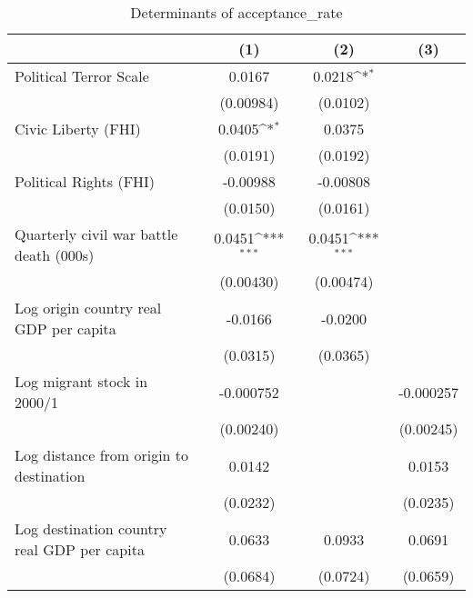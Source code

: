 \begin{table}[htbp]\centering
\def\sym#1{\ifmmode^{#1}\else\(^{#1}\)\fi}
\caption{Determinants of acceptance\_rate}
\begin{tabular}{l*{3}{c}}
\hline\hline
                    &\multicolumn{1}{c}{(1)}         &\multicolumn{1}{c}{(2)}         &\multicolumn{1}{c}{(3)}         \\
\hline
Political Terror Scale&      0.0167         &      0.0218\sym{*}  &                     \\
                    &   (0.00984)         &    (0.0102)         &                     \\
[1em]
Civic Liberty (FHI) &      0.0405\sym{*}  &      0.0375         &                     \\
                    &    (0.0191)         &    (0.0192)         &                     \\
[1em]
Political Rights (FHI)&    -0.00988         &    -0.00808         &                     \\
                    &    (0.0150)         &    (0.0161)         &                     \\
[1em]
Quarterly civil war battle death (000s)&      0.0451\sym{***}&      0.0451\sym{***}&                     \\
                    &   (0.00430)         &   (0.00474)         &                     \\
[1em]
Log origin country real GDP per capita&     -0.0166         &     -0.0200         &                     \\
                    &    (0.0315)         &    (0.0365)         &                     \\
[1em]
Log migrant stock in 2000/1&   -0.000752         &                     &   -0.000257         \\
                    &   (0.00240)         &                     &   (0.00245)         \\
[1em]
Log distance from origin to destination&      0.0142         &                     &      0.0153         \\
                    &    (0.0232)         &                     &    (0.0235)         \\
[1em]
Log destination country real GDP per capita&      0.0633         &      0.0933         &      0.0691         \\
                    &    (0.0684)         &    (0.0724)         &    (0.0659)         \\

\end{tabular}
\end{table}
